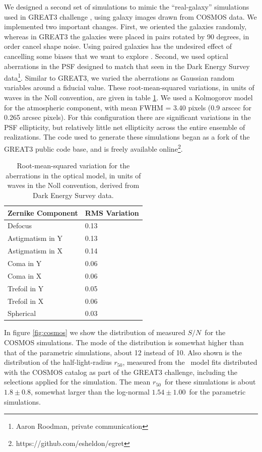 \documentclass[usegraphicx,usenatbib]{mn2e}
\newcommand{\snr}{$S/N$}
\newcommand{\hlr}{$r_{50}$}
\newcommand{\galrdist}{$1.54 \pm 1.00$}
\newcommand{\cosmosrdist}{$1.8 \pm 0.8$}
\begin{document}
We designed a second set of simulations to mimic the ``real-galaxy''
simulations used in GREAT3 challenge \citep{great3}, using galaxy images drawn
from COSMOS data.  We implemented two important changes.  First, we oriented
the galaxies randomly, whereas in GREAT3 the galaxies were placed in pairs
rotated by 90 degrees, in order cancel shape noise.  Using paired galaxies has
the undesired effect of cancelling some biases that we want to
explore \citep{DESSVShear}.  Second, we used optical aberrations in the PSF
designed to match that seen in the Dark Energy Survey data\footnote{Aaron
Roodman, private communication}.  Similar to GREAT3, we varied the aberrations
as Gaussian random variables around a fiducial value. These root-mean-squared variations, in
units of waves in the Noll convention, are given in table \ref{tab:aberr}.  We
used a Kolmogorov model for the atmospheric component, with mean FWHM = 3.40
pixels (0.9 arscec for 0.265 arcsec pixels).  For this configuration there are
significant variations in the PSF ellipticity, but relatively little net
ellipticity across the entire ensemble of realizations.  The code used to
generate these simulations began as a fork of the GREAT3 public code base, and
is freely available online\footnote{https://github.com/esheldon/egret}.

\begin{table}
    \centering
    \caption{Root-mean-squared variation for the aberrations in the optical model,
        in units of waves in the Noll convention, derived 
    from Dark Energy Survey data. \label{tab:aberr}}
    \begin{tabular}{ | l | l | }
        Zernike Component  & RMS Variation \\
        \hline
        Defocus & 0.13 \\
        Astigmatism in Y & 0.13 \\
        Astigmatism in X & 0.14 \\
        Coma in Y & 0.06 \\
        Coma in X & 0.06 \\
        Trefoil in Y & 0.05 \\
        Trefoil in X & 0.06 \\
        Spherical & 0.03 \\

    \end{tabular}
\end{table}

In figure \ref{fig:cosmos} we show the distribution of measured \snr\ for the
COSMOS simulations.  The mode of the distribution is somewhat higher than that
of the parametric simulations, about 12 instead of 10.  Also shown is the
distribution of the half-light-radius \hlr, measured from the \sersic\ model
fits distributed with the COSMOS catalog as part of the GREAT3 challenge,
including the selections applied for the simulation.  The mean \hlr\ for these
simulations is about \cosmosrdist, somewhat larger than the log-normal
\galrdist\ for the parametric simulations.
\end{document}
